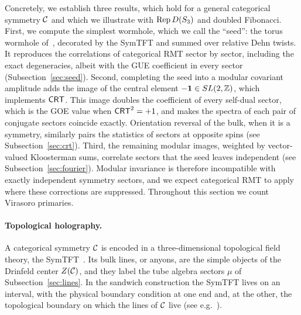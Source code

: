 \documentclass[11pt]{article}
\numberwithin{equation}{section}
\begin{document}
Concretely, we establish three results, which hold for a general categorical symmetry $\mathcal C$ and which we illustrate with $\operatorname{Rep} D(S_3)$ and doubled Fibonacci. First, we compute the simplest wormhole, which we call the ``seed'': the torus wormhole of~\cite{Cotler:2020ugk}, decorated by the SymTFT and summed over relative Dehn twists. It reproduces the correlations of categorical RMT sector by sector, including the exact degeneracies, albeit with the GUE coefficient in every sector (Subsection~\ref{sec:seed}). Second, completing the seed into a modular covariant amplitude adds the image of the central element $-\mathbf 1\in SL(2,\mathbb Z)$, which implements $\mathsf{CRT}$. This image doubles the coefficient of every self-dual sector, which is the GOE value when $\mathsf{CRT}^2=+1$, and makes the spectra of each pair of conjugate sectors coincide exactly. Orientation reversal of the bulk, when it is a symmetry, similarly pairs the statistics of sectors at opposite spins (see Subsection~\ref{sec:crt}). Third, the remaining modular images, weighted by vector-valued Kloosterman sums, correlate sectors that the seed leaves independent (see Subsection~\ref{sec:fourier}). Modular invariance is therefore incompatible with exactly independent symmetry sectors, and we expect categorical RMT to apply where these corrections are suppressed. Throughout this section we count Virasoro primaries.

\paragraph{Topological holography.} A categorical symmetry $\mathcal C$ is encoded in a three-dimensional topological field theory, the SymTFT~\cite{Gaiotto:2020iye,Apruzzi:2021nmk,Freed:2022qnc,Kaidi:2022cpf,Ji:2019jhk,Moradi:2022lqp}. Its bulk lines, or anyons, are the simple objects of the Drinfeld center $Z(\mathcal C)$, and they label the tube algebra sectors $\mu$ of Subsection~\ref{sec:lines}. In the sandwich construction the SymTFT lives on an interval, with the physical boundary condition at one end and, at the other, the topological boundary on which the lines of $\mathcal C$ live (see e.g.~\cite{Freed:2022qnc,Kaidi:2022cpf}).
\end{document}
